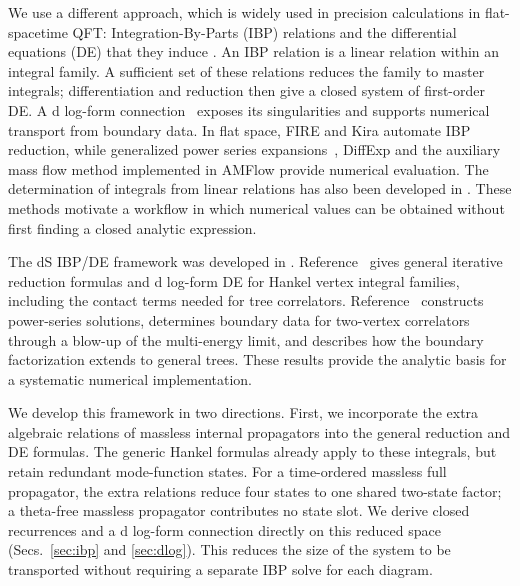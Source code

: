 \documentclass[11pt,a4paper]{article}
\numberwithin{table}{section}
\begin{document}
We use a different approach, which is widely used in precision calculations in
flat-spacetime QFT: Integration-By-Parts (IBP) relations \cite{Chetyrkin:1981qh} and the
differential equations (DE) that they induce \cite{Kotikov:1990kg,Kotikov:1991pm,Bern:1993kr,Gehrmann:1999as}.
An IBP relation is a linear relation within an integral family. A sufficient set of these
relations reduces the family to master integrals; differentiation and reduction then give a
closed system of first-order DE. A d log-form connection~\cite{Henn:2013pwa} exposes its
singularities and supports numerical transport from boundary data. In flat space, FIRE
\cite{Smirnov:2019qkx,Smirnov:2025prc} and Kira
\cite{Maierhofer:2017gsa,Klappert:2020nbg,Lange:2025fba} automate IBP reduction, while generalized
power series expansions~\cite{Moriello:2019yhu}, DiffExp
\cite{Hidding:2020ytt} and the auxiliary mass flow method implemented in AMFlow
\cite{Liu:2017jxz,Liu:2020kpc,Liu:2022chg,Huang:2026rjb} provide numerical evaluation.
The determination of integrals from linear relations has also been developed
in \cite{Liu:2022mfb}. These methods motivate a workflow in which numerical values can be
obtained without first finding a closed analytic expression.

The dS IBP/DE framework was developed in \cite{Chen:2023iix,Chen:2024glu,Chen:2026dqp}.
Reference~\cite{Chen:2023iix} gives general iterative reduction formulas and d log-form DE
for Hankel vertex integral families, including the contact terms needed for tree correlators.
Reference~\cite{Chen:2024glu} constructs power-series solutions, determines boundary data
for two-vertex correlators through a blow-up of the multi-energy limit, and describes how the
boundary factorization extends to general trees. These results provide the analytic basis for
a systematic numerical implementation.

We develop this framework in two directions. First, we incorporate the extra algebraic
relations of massless internal propagators into the general reduction and DE formulas.
The generic Hankel formulas already apply to these integrals, but retain redundant mode-function
states. For a time-ordered massless full propagator, the extra relations reduce four states
to one shared two-state factor; a theta-free massless propagator contributes no state slot.
We derive closed recurrences and a d log-form connection directly on this reduced space
(Secs.~\ref{sec:ibp} and \ref{sec:dlog}). This reduces the size of the system to be transported
without requiring a separate IBP solve for each diagram.
\end{document}
